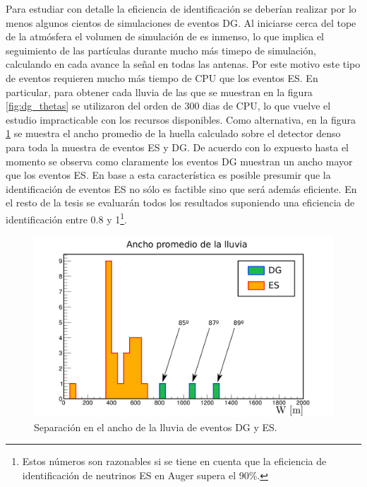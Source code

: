 	Para estudiar con detalle la eficiencia de identificaci\'on se deber\'ian realizar por lo menos algunos cientos de simulaciones de eventos DG. 
	Al iniciarse cerca del tope de la atm\'osfera el volumen de simulaci\'on de \aires{} es inmenso, lo que implica el seguimiento de las part\'iculas durante mucho m\'as timepo de simulaci\'on, calculando en cada avance la se\~nal en todas las antenas.
	Por este motivo este tipo de eventos requieren mucho m\'as tiempo de CPU que los eventos ES.
	En particular, para obtener cada lluvia de las que se muestran en la figura \ref{fig:dg_thetas} se utilizaron del orden de 300 dias de CPU, lo que vuelve el estudio impracticable con los recursos disponibles.
	Como alternativa, en la figura \ref{fig:dg_vs_es_Idradio} se muestra el ancho promedio de la huella calculado sobre el detector denso para toda la muestra de eventos ES y DG.
	De acuerdo con lo expuesto hasta el momento se observa como claramente los eventos DG muestran un ancho mayor que los eventos ES.
	En base a esta caracter\'istica es posible presumir que la identificaci\'on de eventos ES no s\'olo es factible sino que ser\'a adem\'as eficiente.
	En el resto de la tesis se evaluar\'an todos los resultados suponiendo una eficiencia de identificaci\'on entre 0.8 y 1\footnote{Estos n\'umeros son razonables si se tiene en cuenta que la eficiencia de identificaci\'on de neutrinos ES en Auger supera el 90$\%$.}.
	\begin{figure}[ht!]
		\centering
		\includegraphics[width=\textwidth]{./fig/resultadosRadio/showerWidth_Comp_DG_ES_Wt}
		\caption{\label{fig:dg_vs_es_Idradio}
		Separaci\'on en el ancho de la lluvia de eventos DG y ES. 
		}
	\end{figure}
	

